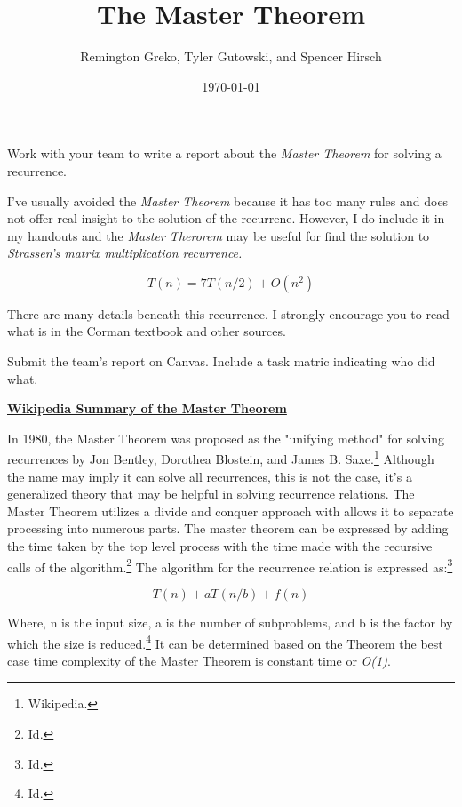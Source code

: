 \documentclass{article}
\begin{document}
\title{\textbf{The Master Theorem}}
\author{Remington Greko, Tyler Gutowski, and Spencer Hirsch}
\date{\today}

\maketitle

\noindent Work with your team to write a report about the \textit{Master Theorem} for solving
a recurrence.

I've usually avoided the \textit{Master Theorem} because it has too many rules and does not
offer real insight to the solution of the recurrene. However, I do include it in my handouts
and the \textit{Master Therorem} may be useful for find the solution to \textit{Strassen's
matrix multiplication recurrence.}

\[T(n) = 7T(n/2) + O(n^2)\]

\noindent There are many details beneath this recurrence. I strongly encourage you to read
what is in the Corman textbook and other sources.

Submit the team's report on Canvas. Include a task matric indicating who did what.

\pagebreak

\noindent \textbf{\href{https://en.wikipedia.org/wiki/Master_theorem_(analysis_of_algorithms)}{Wikipedia Summary of the Master Theorem}}

In 1980, the Master Theorem was proposed as the "unifying method" for solving recurrences by Jon Bentley, Dorothea Blostein, and James B. Saxe.\footnote{Wikipedia.}
Although the name may imply it can solve all recurrences, this is not the case, it's a generalized theory that may be helpful in
solving recurrence relations. The Master Theorem utilizes a divide and conquer approach with allows it to separate processing into
numerous parts. The master theorem can be expressed by adding the time taken by the top level process with the time made with the recursive
calls of the algorithm.\footnote{Id.} The algorithm for the recurrence relation is expressed as:\footnote{Id.}

\[T(n) + aT(n/b) + f(n)\]

\noindent Where, n is the input size, a is the number of subproblems, and b is the factor by which the size is reduced.\footnote{Id.} It can be determined
based on the Theorem the best case time complexity of the Master Theorem is constant time or \textit{O(1)}.

\bigskip
\end{document}
